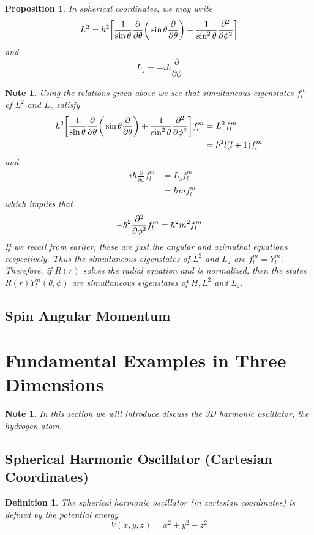 \documentclass[12pt]{amsart}
\newtheorem{prop}[thm]{Proposition}
\newtheorem{defn}[thm]{Definition}
\newtheorem{note}[thm]{Note}
\newcommand{\p}[1]{\frac{\partial}{\partial{#1}}}
\begin{document}
\begin{prop}
In spherical coordinates, we may write $$L^2 = \hbar^2\bigg[ \frac{1}{\sin \theta }\p{\theta} \bigg( \sin \theta \p{\theta} \bigg) + \frac{1}{\sin^2 \theta} \pdv[2]{}{\phi}\bigg]$$ and $$L_z = -i\hbar \p{\phi}$$
\end{prop}

\begin{note}
Using the relations given above we see that simultaneous eigenstates $f_l^m$ of $L^2$ and $L_z$ satisfy 
\begin{align*}
\hbar^2\bigg[ \frac{1}{\sin \theta }\p{\theta} \bigg( \sin \theta \p{\theta} \bigg) + \frac{1}{\sin^2 \theta} \pdv[2]{}{\phi}\bigg] f_l^m 
&= L^2 f_l^m \\
&= \hbar^2 l(l+1) f_l^m 
\end{align*}
and 
\begin{align*}
-i \hbar \p{\phi} f_l^m 
&= L_z f_l^m \\
&= \hbar m f_l^m 
\end{align*}
which implies that $$-\hbar^2 \pdv[2]{}{\phi}f_l^m  = \hbar^2 m^2 f_l^m $$
If we recall from earlier, these are just the angular and azimuthal equations respectively. Thus the simultaneous eigenstates of $L^2$ and $L_z$ are $f_l^m = Y_l^m$. Therefore, if $R(r)$ solves the radial equation and is normalized, then the states $R(r)Y_l^m(\theta, \phi)$ are simultaneous eigenstates of $H, L^2$ and $L_z$.
\end{note}
\newpage

\subsection{Spin Angular Momentum}


\newpage

\section{Fundamental Examples in Three Dimensions}
\begin{note}
In this section we will introduce discuss the 3D harmonic oscillator, the hydrogen atom.
\end{note}

\subsection{Spherical Harmonic Oscillator (Cartesian Coordinates)}

\begin{defn}
The spherical harmonic oscillator (in cartesian coordinates) is defined by the potential energy
$$V(x,y,z) = x^2 + y^2 + z^2$$
\end{defn}
\end{document}
